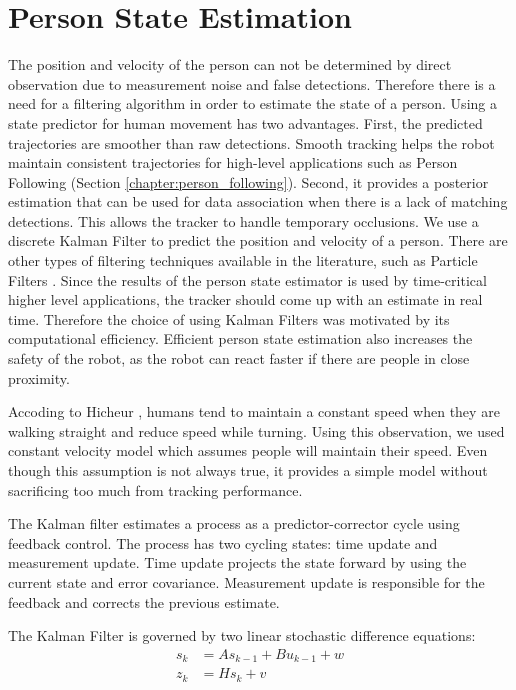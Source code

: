 \section{Person State Estimation}
\label{sec:multimodal_person_state_estimation}

The position and velocity of the person can not be determined by direct observation due to measurement noise and false detections. Therefore there is a need for a filtering algorithm in order to estimate the state of a person. Using a state predictor for human movement has two advantages. First, the predicted trajectories are smoother than raw detections. Smooth tracking helps the robot maintain consistent trajectories for high-level applications such as Person Following (Section \ref{chapter:person_following}). Second, it provides a posterior estimation that can be used for data association when there is a lack of matching detections. This allows the tracker to handle temporary occlusions. We use a discrete Kalman Filter \cite{kalman1960new} to predict the position and velocity of a person. There are other types of filtering techniques available in the literature, such as Particle Filters \cite{khan2004mcmc}. Since the results of the person state estimator is used by time-critical higher level applications, the tracker should come up with an estimate in real time. Therefore the choice of using Kalman Filters was motivated by its computational efficiency. Efficient person state estimation also increases the safety of the robot, as the robot can react faster if there are people in close proximity.

Accoding to Hicheur \cite{hicheur2005velocity}, humans tend to maintain a constant speed when they are walking straight and reduce speed while turning. Using this observation, we used constant velocity model which assumes people will maintain their speed. Even though this assumption is not always true, it provides a simple model without sacrificing too much from tracking performance.

The Kalman filter estimates a process as a predictor-corrector cycle using feedback control. The process has two cycling states: time update and measurement update. Time update projects the state forward by using the current state and error covariance. Measurement update is responsible for the feedback and corrects the previous estimate.

The Kalman Filter is governed by two linear stochastic difference equations:
\begin{align}
s_k&=As_{k-1}+Bu_{k-1}+w \\
z_k&=Hs_k+v
\end{align}

